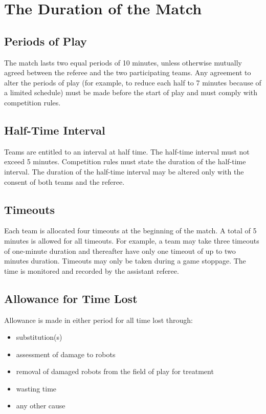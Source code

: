 \section{The Duration of the Match}\label{sec:duration-of-the-match}

\subsection{Periods of Play}
The match lasts two equal periods of 10 minutes, unless otherwise mutually agreed between the referee and the two participating teams.
Any agreement to alter the periods of play (for example, to reduce each half to 7 minutes because of a limited schedule) must be made before the start of play and must comply with competition rules.

\subsection{Half-Time Interval}
Teams are entitled to an interval at half time.
The half-time interval must not exceed 5 minutes.
Competition rules must state the duration of the half-time interval.
The duration of the half-time interval may be altered only with the consent of both teams and the referee.

\subsection{Timeouts}
Each team is allocated four timeouts at the beginning of the match.
A total of 5 minutes is allowed for all timeouts.
For example, a team may take three timeouts of one-minute duration and thereafter have only one timeout of up to two minutes duration.
Timeouts may only be taken during a game stoppage.
The time is monitored and recorded by the assistant referee.

\subsection{Allowance for Time Lost}
Allowance is made in either period for all time lost through:

\begin{itemize}
\item substitution(s)
\item assessment of damage to robots
\item removal of damaged robots from the field of play for treatment
\item wasting time
\item any other cause
\end{itemize}

